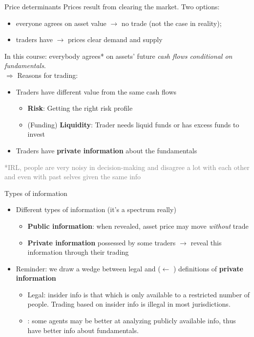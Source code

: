 \documentclass[english,10pt
,aspectratio=169
]{beamer}
\begin{document}
\begin{frame}{Price determinants}
	Prices result from clearing the market. Two options:
	\begin{itemize}
		\item everyone agrees on asset value $\rightarrow$ no trade (not the case in reality);
		\item traders have   $\rightarrow$ prices clear demand and supply
	\end{itemize}
	\pause 
	
	In this course: everybody agrees* on assets' future \emph{cash flows conditional on fundamentals}. 
	\pause 
	\\$\Rightarrow$ Reasons for trading:
	\begin{itemize}
		\item Traders have different value from the same cash flows
		\begin{itemize}
			\item \textbf{Risk}: Getting the right risk profile
			\item (Funding) \textbf{Liquidity}: Trader needs liquid funds or has excess funds to invest
		\end{itemize}
		\item Traders have \textbf{private information} about the fundamentals
	\end{itemize}
	\textcolor{gray}{*IRL, people are very noisy in decision-making and disagree a lot with each other and even with past selves given the same info \citep*{kahneman_noise_2021}}
\end{frame}


\begin{frame}{Types of information}
	\begin{itemize}
		\item Different types of information (it's a spectrum really)
		\begin{itemize}
			\item \textbf{Public information}: when revealed, asset price may move \textit{without} trade
			\item \textbf{Private information} possessed by some traders  $\rightarrow$ reveal this information through their trading
		\end{itemize}
		\pause
		\item Reminder: we draw a wedge between \alert{legal} and  ($\leftarrow$ ) definitions of \textbf{private information}
		\begin{itemize}
			\item \alert{Legal}: insider info is that which is only available to a restricted number of people. Trading based on insider info is illegal in most jurisdictions.
			\item {}: some agents may be better at analyzing publicly available info, thus have better info about fundamentals.
		\end{itemize}
	\end{itemize}
\end{frame}
\end{document}

